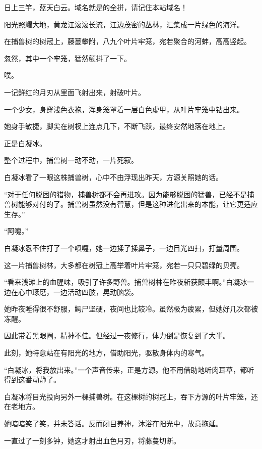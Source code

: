
\begin{this_body}



日上三竿，蓝天白云。域名就是的全拼，请记住本站域名！

阳光照耀大地，黄龙江滚滚长流，江边茂密的丛林，汇集成一片绿色的海洋。

在捕兽树的树冠上，藤蔓攀附，八九个叶片牢笼，宛若聚合的河蚌，高高竖起。

忽然，其中一个牢笼，猛然颤抖了一下。

噗。

一记鲜红的月刃从里面飞射出来，射破叶片。

一个少女，身穿浅色衣袍，浑身笼罩着一层白色虚甲，从叶片牢笼中钻出来。

她身手敏捷，脚尖在树杈上连点几下，不断飞跃，最终安然地落在地上。

正是白凝冰。

整个过程中，捕兽树一动不动，一片死寂。

白凝冰看了一眼这株捕兽树，心中不由浮现出昨天，方源关照她的话。

“对于任何脱困的猎物，捕兽树都不会再进攻。因为能够脱困的猛兽，已经不是捕兽树能够对付的了。捕兽树虽然没有智慧，但是这种进化出来的本能，让它更适应生存。”

“阿嚏。”

白凝冰忍不住打了一个喷嚏，她一边揉了揉鼻子，一边目光四扫，打量周围。

这一片捕兽树林，大多都在树冠上高举着叶片牢笼，宛若一只只碧绿的贝壳。

“看来浅滩上的血腥味，吸引了许多野兽。捕兽树林在昨夜斩获颇丰啊。”白凝冰一边在心中琢磨，一边活动四肢，晃动脑袋。

她昨夜睡得很不舒服，鳄尸坚硬，夜间也比较冷。虽然极为疲累，但她好几次都被冻醒。

因此带着黑眼圈，精神不佳。但经过一夜修行，体力倒是恢复到了大半。

此刻，她特意站在有阳光的地方，借助阳光，驱散身体内的寒气。

“白凝冰，将我放出来。”一个声音传来，正是方源。他不用借助地听肉耳草，都听得到这番动静了。

白凝冰将目光投向另外一棵捕兽树。在这棵树的树冠上，吞下方源的叶片牢笼，还在老地方。

她暗暗笑了笑，并未答话。反而闭目养神，沐浴在阳光中，故意拖延。

一直过了一刻多钟，她这才射出血色月刃，将藤蔓切断。


\end{this_body}
